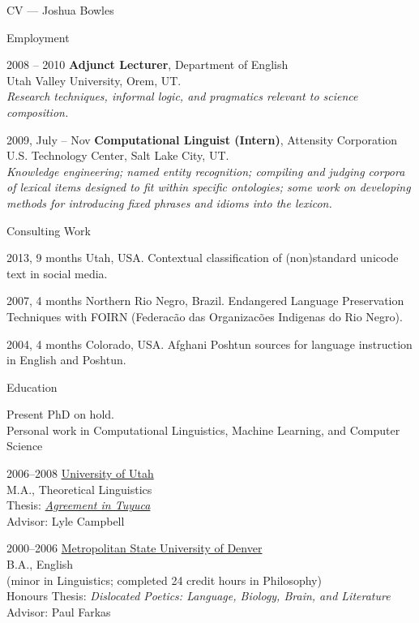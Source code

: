 \begin{cv}{CV --- Joshua Bowles}
\begin{cvlist}{Employment}
\item[2008 -- 2010] {\bf Adjunct Lecturer}, Department of English\\
     Utah Valley University, Orem, UT.\\
		 \textsl{Research techniques, informal logic, and pragmatics relevant to science composition.}

\item[2009, July -- Nov] {\bf Computational Linguist (Intern)}, Attensity Corporation\\
     U.S. Technology Center, Salt Lake City, UT.\\
		\textsl{Knowledge engineering; named entity recognition; compiling and judging corpora of lexical
		items designed to fit within specific ontologies; some work on developing methods for introducing
		fixed phrases and idioms into the lexicon.}  
\end{cvlist}

\begin{cvlist}{Consulting Work}
\item[2013, 9 months] Utah, USA. Contextual classification of (non)standard unicode text in social media.
\item[2007, 4 months] Northern Rio Negro, Brazil. Endangered Language Preservation Techniques with FOIRN (Federac\~ao das Organizac\~oes Indigenas do Rio Negro). 
\item[2004, 4 months] Colorado, USA. Afghani Poshtun sources for language instruction in English and Poshtun.
\end{cvlist}

\begin{cvlist}{Education}
                \item[Present] PhD on hold. \\ Personal work in Computational Linguistics, Machine Learning, and Computer Science  
                \item[2006--2008] \href{http://www.linguistics.utah.edu/}{University of Utah}\\
                        M.A., Theoretical Linguistics\\
                        Thesis:
												\href{http://content.lib.utah.edu/cdm/singleitem/collection/etd2/id/1431/rec/1}{\emph{Agreement in Tuyuca}}\\
												Advisor: Lyle Campbell 
                \item[2000--2006] \href{http://www.msudenver.edu/las/}{Metropolitan State University of Denver}\\
                        B.A., English\\ 
			(minor in Linguistics; completed 24 credit hours in Philosophy)\\
                        Honours Thesis: \emph{Dislocated Poetics: Language, Biology, Brain, and Literature}
												Advisor: Paul Farkas 
\end{cvlist}


\end{cv}
